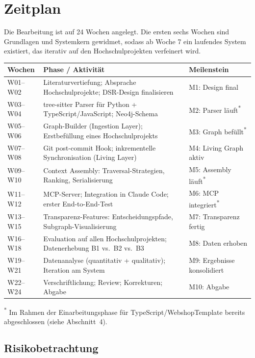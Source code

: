 \section{Zeitplan}

Die Bearbeitung ist auf 24 Wochen angelegt. Die ersten sechs Wochen sind Grundlagen und Systemkern gewidmet, sodass ab Woche 7 ein laufendes System existiert, das iterativ auf den Hochschulprojekten verfeinert wird.

\begin{tabularx}{\linewidth}{@{}lXl@{}}
  \toprule
  \textbf{Wochen} & \textbf{Phase / Aktivität} & \textbf{Meilenstein} \\
  \midrule
  W01--W02 & Literaturvertiefung; Absprache Hochschulprojekte; DSR-Design finalisieren & M1: Design final \\
  W03--W04 & tree-sitter Parser für Python + TypeScript/JavaScript; Neo4j-Schema & M2: Parser läuft\textsuperscript{*} \\
  W05--W06 & Graph-Builder (Ingestion Layer); Erstbefüllung eines Hochschulprojekts & M3: Graph befüllt\textsuperscript{*} \\
  W07--W08 & Git post-commit Hook; inkrementelle Synchronisation (Living Layer) & M4: Living Graph aktiv \\
  W09--W10 & Context Assembly: Traversal-Strategien, Ranking, Serialisierung & M5: Assembly läuft\textsuperscript{*} \\
  W11--W12 & MCP-Server; Integration in Claude Code; erster End-to-End-Test & M6: MCP integriert\textsuperscript{*} \\
  W13--W15 & Transparenz-Features: Entscheidungspfade, Subgraph-Visualisierung & M7: Transparenz fertig \\
  W16--W18 & Evaluation auf allen Hochschulprojekten; Datenerhebung B1 vs.\ B2 vs.\ B3 & M8: Daten erhoben \\
  W19--W21 & Datenanalyse (quantitativ + qualitativ); Iteration am System & M9: Ergebnisse konsolidiert \\
  W22--W24 & Verschriftlichung; Review; Korrekturen; Abgabe & M10: Abgabe \\
  \bottomrule
\end{tabularx}

\noindent\textsuperscript{*} Im Rahmen der Einarbeitungsphase für TypeScript/WebshopTemplate bereits abgeschlossen (siehe Abschnitt~4).

\subsection*{Risikobetrachtung}

